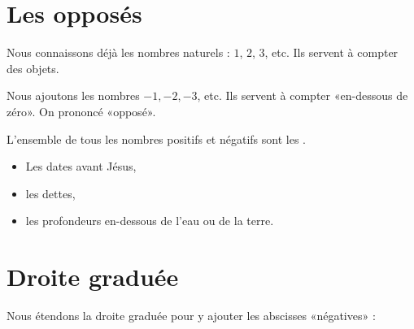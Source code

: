 



\section{Les opposés}

Nous connaissons déjà les nombres naturels : \( 1\), \( 2\), \( 3\), etc. Ils servent à compter des objets.
\begin{definition}
    Nous ajoutons les nombres \( -1, -2, -3\), etc. Ils servent à compter «en-dessous de zéro». On prononcé «opposé».
\end{definition}

\begin{definition}
    L'ensemble de tous les nombres positifs et négatifs sont les .
\end{definition}

\begin{example}
    \begin{itemize}
        \item Les dates avant Jésus,
        \item les dettes,
        \item les profondeurs en-dessous de l'eau ou de la terre.
    \end{itemize}
\end{example}

\section{Droite graduée}



\vspace{3cm}

Nous étendons la droite graduée pour y ajouter les abscisses «négatives» :
\begin{center}
    
\end{center}


